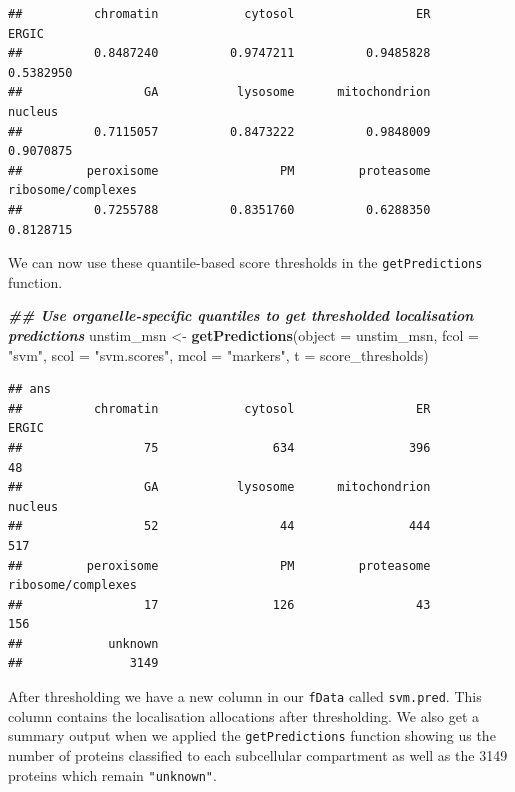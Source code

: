 \documentclass[9pt,a4paper,]{extarticle}
\newenvironment{Shaded}{\begin{snugshade}}{\end{snugshade}}
\newcommand{\AttributeTok}[1]{\textcolor[rgb]{0.13,0.29,0.53}{#1}}
\newcommand{\DocumentationTok}[1]{\textcolor[rgb]{0.56,0.35,0.01}{\textbf{\textit{#1}}}}
\newcommand{\FunctionTok}[1]{\textcolor[rgb]{0.13,0.29,0.53}{\textbf{#1}}}
\newcommand{\NormalTok}[1]{#1}
\newcommand{\OtherTok}[1]{\textcolor[rgb]{0.56,0.35,0.01}{#1}}
\newcommand{\StringTok}[1]{\textcolor[rgb]{0.31,0.60,0.02}{#1}}
\begin{document}
\begin{verbatim}
##          chromatin            cytosol                 ER              ERGIC 
##          0.8487240          0.9747211          0.9485828          0.5382950 
##                 GA           lysosome      mitochondrion            nucleus 
##          0.7115057          0.8473222          0.9848009          0.9070875 
##         peroxisome                 PM         proteasome ribosome/complexes 
##          0.7255788          0.8351760          0.6288350          0.8128715
\end{verbatim}

We can now use these quantile-based score thresholds in the \texttt{getPredictions}
function.

\begin{Shaded}
\begin{Highlighting}[]
\DocumentationTok{\#\# Use organelle{-}specific quantiles to get thresholded localisation predictions}
\NormalTok{unstim\_msn }\OtherTok{\textless{}{-}} \FunctionTok{getPredictions}\NormalTok{(}\AttributeTok{object =}\NormalTok{ unstim\_msn, }
                             \AttributeTok{fcol =} \StringTok{"svm"}\NormalTok{,}
                             \AttributeTok{scol =} \StringTok{"svm.scores"}\NormalTok{,}
                             \AttributeTok{mcol =} \StringTok{"markers"}\NormalTok{,}
                             \AttributeTok{t =}\NormalTok{ score\_thresholds)}
\end{Highlighting}
\end{Shaded}

\begin{verbatim}
## ans
##          chromatin            cytosol                 ER              ERGIC 
##                 75                634                396                 48 
##                 GA           lysosome      mitochondrion            nucleus 
##                 52                 44                444                517 
##         peroxisome                 PM         proteasome ribosome/complexes 
##                 17                126                 43                156 
##            unknown 
##               3149
\end{verbatim}

After thresholding we have a new column in our \texttt{fData} called \texttt{svm.pred}. This
column contains the localisation allocations after thresholding. We also get
a summary output when we applied the \texttt{getPredictions} function showing us the
number of proteins classified to each subcellular compartment as well as the
3149 proteins which remain
\texttt{"unknown"}.
\end{document}
